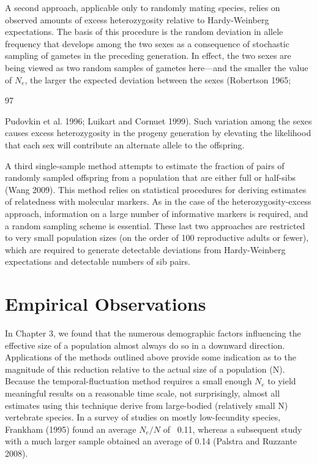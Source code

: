 \documentclass{article}
\begin{document}
A second approach, applicable only to randomly mating species, relies on observed amounts of excess heterozygosity relative to Hardy-Weinberg expectations. The basis of this procedure is the random deviation in allele frequency that develops among the two sexes as a consequence of stochastic sampling of gametes in the preceding generation. In effect, the two sexes are being viewed as two random samples of gametes here—and the smaller the value of  $ N_{e} $, the larger the expected deviation between the sexes (Robertson 1965;

97

Pudovkin et al. 1996; Luikart and Cornuet 1999). Such variation among the sexes causes excess heterozygosity in the progeny generation by elevating the likelihood that each sex will contribute an alternate allele to the offspring.

A third single-sample method attempts to estimate the fraction of pairs of randomly sampled offspring from a population that are either full or half-sibs (Wang 2009). This method relies on statistical procedures for deriving estimates of relatedness with molecular markers. As in the case of the heterozygosity-excess approach, information on a large number of informative markers is required, and a random sampling scheme is essential. These last two approaches are restricted to very small population sizes (on the order of 100 reproductive adults or fewer), which are required to generate detectable deviations from Hardy-Weinberg expectations and detectable numbers of sib pairs.

\section{Empirical Observations}
In Chapter 3, we found that the numerous demographic factors influencing the effective size of a population almost always do so in a downward direction. Applications of the methods outlined above provide some indication as to the magnitude of this reduction relative to the actual size of a population (N). Because the temporal-fluctuation method requires a small enough  $ N_{e} $ to yield meaningful results on a reasonable time scale, not surprisingly, almost all estimates using this technique derive from large-bodied (relatively small N) vertebrate species. In a survey of studies on mostly low-fecundity species, Frankham (1995) found an average  $ N_{e}/N $ of ~0.11, whereas a subsequent study with a much larger sample obtained an average of 0.14 (Palstra and Ruzzante 2008).
\end{document}
